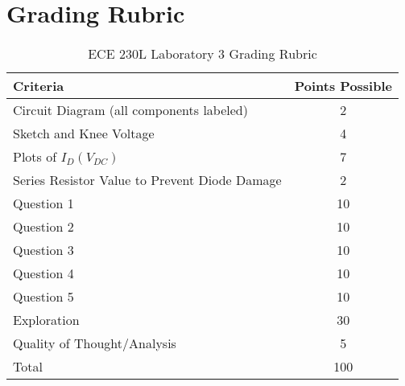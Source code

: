\documentclass[12pt]{../manual}
\begin{document}
\section*{Grading Rubric}
\vfill %
\begin{table}[ht!]
\caption{ECE 230L Laboratory 3 Grading Rubric}
\centering
\begin{tabular}{l|c} \hline
Criteria & Points Possible \\ \hline \hline
Circuit Diagram (all components labeled) 			& 2 \\ \hline
Sketch and Knee Voltage								& 4 \\ \hline
Plots of $I_D(V_{DC})$								& 7 \\ \hline
Series Resistor Value to Prevent Diode Damage		& 2 \\ \hline
Question 1											& 10 \\ \hline
Question 2											& 10 \\ \hline
Question 3											& 10 \\ \hline
Question 4											& 10 \\ \hline
Question 5											& 10 \\ \hline
Exploration											& 30 \\ \hline
Quality of Thought/Analysis							& 5 \\ \hline
Total												& 100 \\ \hline
\end{tabular}
\end{table}
\vfill %
\end{document}
